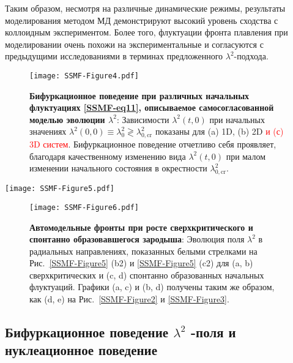 Таким образом, несмотря на различные динамические режимы, результаты моделирования методом МД демонстрируют высокий уровень сходства с коллоидным экспериментом.
Более того, флуктуации фронта плавления при моделировании очень похожи на экспериментальные и согласуются с предыдущими исследованиями \cite{10.1038/ncomms7942} в терминах предложенного $\lambda^2$-подхода.

\begin{figure}[!t]
\centering
 \texttt{[image: SSMF-Figure4.pdf]}
 \caption{\textbf{Бифуркационное поведение при различных начальных флуктуациях \eqref {SSMF-eq11}, описываемое самосогласованной моделью эволюции $\lambda^2$}:
 Зависимости $\lambda^2(t, 0)$ при начальных значениях $ \lambda^2(0,0)\equiv\lambda_0 ^2\gtrless\lambda_{0,\mathrm {cr}}^2$ показаны для (a) 1D, (b) 2D \textcolor{red}{и (с) 3D систем}. Бифуркационное поведение отчетливо себя проявляет, благодаря качественному изменению вида $\lambda ^ 2(t,0)$ при малом изменении начального состояния в окрестности $\lambda_ {0,\mathrm{cr}}^2$.}
\label{SSMF-Figure4}
\end{figure}


\begin{figure*}[!t]
\centering
\texttt{[image: SSMF-Figure5.pdf]}
 \caption{\textbf{Эволюция различных начальных $\lambda^2$-флуктуаций и спонтанное зародышеобразование в однородной системе}:
 Последовательность снимков эволюции (a) докритической и (b) сверхкритической начальной флуктуации $\lambda^2$ и (c) спонтанного зарождения из-за теплового шума.}
\label{SSMF-Figure5}
\end{figure*}

\begin{figure}[!t]
\centering
\texttt{[image: SSMF-Figure6.pdf]}
 \caption{\textbf{Автомодельные фронты при росте сверхкритического и спонтанно образовавшегося зародыша}:
 Эволюция поля $ \lambda^2$ в радиальных направлениях, показанных белыми стрелками на Рис.~\ref{SSMF-Figure5} (b2) и \ref{SSMF-Figure5} (c2) для (a, b) сверхкритических и (c, d) спонтанно образованных начальных флуктуаций.
  Графики (a, c) и (b, d) получены таким же образом, как (d, e) на Рис.~\ref{SSMF-Figure2} и \ref{SSMF-Figure3}.}
\label{SSMF-Figure6}
\end{figure}

\subsection{Бифуркационное поведение $\lambda^2$ -поля и нуклеационное поведение}
\label{SSMF-Results-Modeling}

